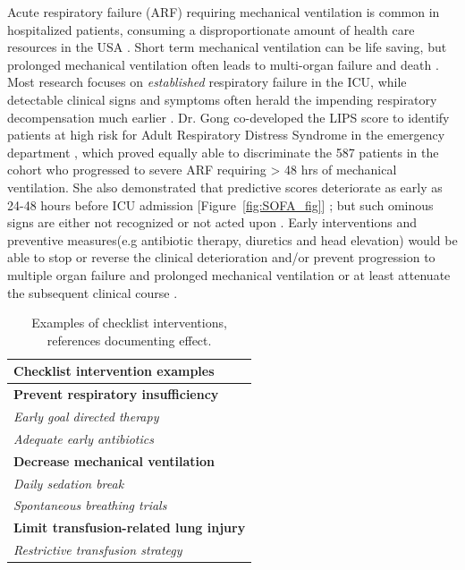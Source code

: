 \documentclass[11pt,notitlepage]{article}
\begin{document}
Acute respiratory failure (ARF) requiring mechanical ventilation is common in hospitalized patients, consuming a disproportionate amount of health care resources in the USA \cite{Wunsch_20639743}. Short term mechanical ventilation can be life saving, but prolonged mechanical ventilation often leads to multi-organ failure and death \cite{Wunsch_20639743, Ranieri_10872010}. Most research focuses on \textit{established} respiratory failure in the ICU, while detectable clinical signs and symptoms often herald the impending respiratory decompensation much earlier \cite{Rohde_23401431}. Dr. Gong co-developed the LIPS score to identify patients at high risk for Adult Respiratory Distress Syndrome in the emergency department \cite{Herridge_12594312}, which proved equally able to discriminate the 587 patients in the cohort who progressed to severe ARF requiring > 48 hrs of mechanical ventilation. She also demonstrated that predictive scores deteriorate as early as 24-48 hours before ICU admission  [Figure~\ref{fig:SOFA_fig}] \cite{Yu_24970344}; but such ominous signs are either not recognized or not acted upon \cite{Hillman_12415452,McQuillan_9632403}. Early interventions and preventive measures(e.g antibiotic therapy, diuretics and head elevation) would be able to stop or reverse the clinical deterioration and/or prevent progression to multiple organ failure and prolonged mechanical ventilation or at least attenuate the subsequent clinical course \cite{Naeem_16150531,Rivers_11794169,Rivers_12594312,Mitchell_20378235}. 

\begin{table} 
\vspace{-25pt}
\begin{center}
\begin{tabular}{l}
\toprule
\multicolumn{1}{l}{\footnotesize Checklist intervention examples}\\
\midrule
\footnotesize \textbf{Prevent respiratory insufficiency}\\
\footnotesize \emph{Early goal directed therapy \cite{Levy_23103175}}\\
\footnotesize \emph{Adequate early antibiotics \cite{Lim_19783532}}\\
\footnotesize \textbf{Decrease mechanical ventilation} \\
\footnotesize \emph{Daily sedation break \cite{Barr_23269131}} \\ 
\footnotesize \emph{Spontaneous breathing trials \cite{Girard_18191684}}\\  
\footnotesize \textbf{Limit transfusion-related lung injury}\\
\footnotesize \emph{Restrictive transfusion strategy \cite{Hebert_9971864}}\\
\hline
\end{tabular}\\
\end{center}
\vspace{-20pt}
\caption{\footnotesize Examples of checklist interventions, references documenting effect.} \label{table:Checklist}
\vspace{-10pt}
\end{table} 
\end{document}
